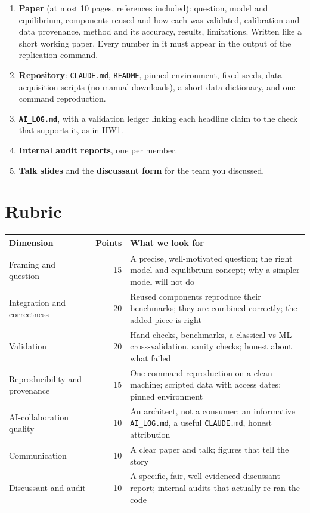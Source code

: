 \documentclass[11pt]{article}
\begin{document}
\begin{enumerate}[leftmargin=*,itemsep=2pt]
  \item \textbf{Paper} (at most 10 pages, references included): question, model and equilibrium,
        components reused and how each was validated, calibration and data provenance, method and
        its accuracy, results, limitations. Written like a short working paper. Every number in it
        must appear in the output of the replication command.
  \item \textbf{Repository}: \texttt{CLAUDE.md}, \texttt{README}, pinned environment, fixed seeds,
        data-acquisition scripts (no manual downloads), a short data dictionary, and one-command
        reproduction.
  \item \textbf{\texttt{AI\_LOG.md}}, with a validation ledger linking each headline claim to the check
        that supports it, as in HW1.
  \item \textbf{Internal audit reports}, one per member.
  \item \textbf{Talk slides} and the \textbf{discussant form} for the team you discussed.
\end{enumerate}

\section{Rubric}

\begin{center}
\small
\renewcommand{\arraystretch}{1.2}
\begin{tabularx}{\linewidth}{@{}p{4.6cm}rL@{}}
\toprule
\textbf{Dimension} & \textbf{Points} & \textbf{What we look for} \\
\midrule
Framing and question & 15 & A precise, well-motivated question; the right model and equilibrium concept; why a simpler model will not do \\
Integration and correctness & 20 & Reused components reproduce their benchmarks; they are combined correctly; the added piece is right \\
Validation & 20 & Hand checks, benchmarks, a classical-vs-ML cross-validation, sanity checks; honest about what failed \\
Reproducibility and provenance & 15 & One-command reproduction on a clean machine; scripted data with access dates; pinned environment \\
AI-collaboration quality & 10 & An architect, not a consumer: an informative \texttt{AI\_LOG.md}, a useful \texttt{CLAUDE.md}, honest attribution \\
Communication & 10 & A clear paper and talk; figures that tell the story \\
Discussant and audit & 10 & A specific, fair, well-evidenced discussant report; internal audits that actually re-ran the code \\
\bottomrule
\end{tabularx}
\end{center}
\end{document}
